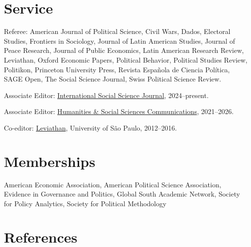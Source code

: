 \documentclass[a4paper]{article}
\renewenvironment{itemize}{
	\begin{list}{}{
			\setlength{\leftmargin}{1.5em}
		}
		}{
	\end{list}
}
\begin{document}
\section*{Service}

\begin{itemize}
    \item Referee: American Journal of Political Science, Civil Wars, Dados, Electoral Studies, Frontiers in Sociology, Journal of Latin American Studies, Journal of Peace Research, Journal of Public Economics, Latin American Research Review, Leviathan, Oxford Economic Papers, Political Behavior, Political Studies Review, Politikon, Princeton University Press, Revista Española de Ciencia Política, SAGE Open, The Social Science Journal, Swiss Political Science Review.
    \item Associate Editor: \href{https://onlinelibrary.wiley.com/journal/14682451}{International Social Science Journal}, 2024--present.
    \item Associate Editor: \href{https://www.nature.com/palcomms/}{Humanities \& Social Sciences Communications}, 2021--2026.
    \item Co-editor: \href{https://www.revistas.usp.br/leviathan}{Leviathan}, University of São Paulo, 2012--2016.
\end{itemize}

\section*{Memberships}

\begin{itemize}
\item American Economic Association, American Political Science Association, Evidence in Governance and Politics, Global South Academic Network, Society for Policy Analytics, Society for Political Methodology
\end{itemize}

\section*{References}
\end{document}
